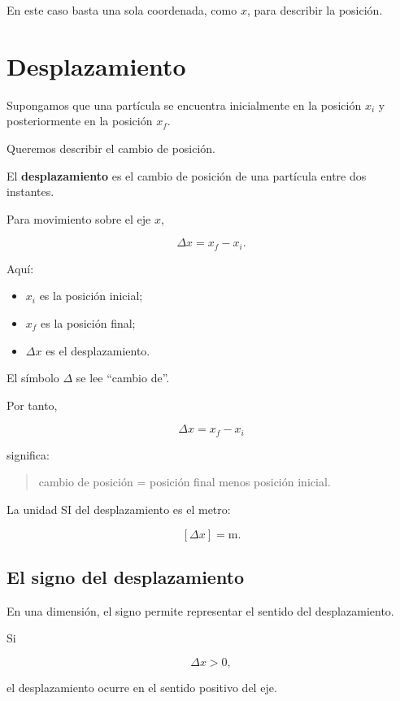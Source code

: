 En este caso basta una sola coordenada, como \(x\), para describir la
posición.


\section{Desplazamiento}

Supongamos que una partícula se encuentra inicialmente en la posición
\(x_i\) y posteriormente en la posición \(x_f\).

Queremos describir el cambio de posición.

\begin{definicion}[Desplazamiento]
El \textbf{desplazamiento} es el cambio de posición de una partícula entre
dos instantes.
\end{definicion}

Para movimiento sobre el eje \(x\),

\[ \boxed{\Delta x=x_f-x_i}. \]

Aquí:

\begin{itemize}
    \item \(x_i\) es la posición inicial;
    \item \(x_f\) es la posición final;
    \item \(\Delta x\) es el desplazamiento.
\end{itemize}

El símbolo \(\Delta\) se lee ``cambio de''.

Por tanto,

\[ \Delta x=x_f-x_i \]

significa:

\begin{quote}
cambio de posición = posición final menos posición inicial.
\end{quote}

La unidad SI del desplazamiento es el metro:

\[ [\Delta x]=\si{\meter}. \]


\subsection{El signo del desplazamiento}

En una dimensión, el signo permite representar el sentido del
desplazamiento.

Si

\[ \Delta x>0, \]

el desplazamiento ocurre en el sentido positivo del eje.

